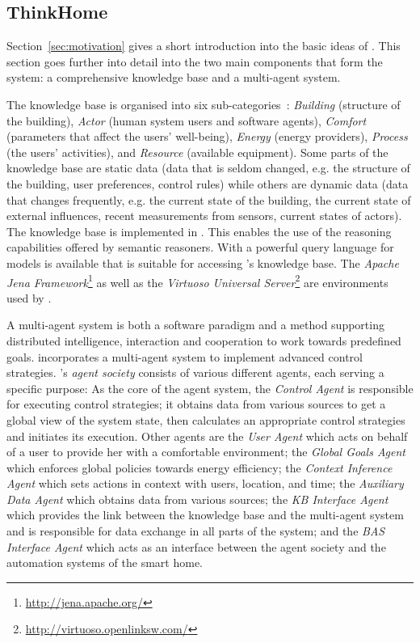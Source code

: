 \subsection{ThinkHome}

Section~\ref{sec:motivation} gives a short introduction into the basic ideas of \thinkhome. This section goes further into detail into the two main components that form the \thinkhome system: a comprehensive knowledge base and a multi-agent system.

The knowledge base is organised into six sub-categories~\cite{CR2011-TH_Journal,CR2010-DEST_ThinkHome}: \emph{Building} (structure of the building), \emph{Actor} (human system users and software agents), \emph{Comfort} (parameters that affect the users' well-being), \emph{Energy} (energy providers), \emph{Process} (the users' activities), and \emph{Resource} (available equipment). Some parts of the knowledge base are static data (data that is seldom changed, e.g. the structure of the building, user preferences, control rules) while others are dynamic data (data that changes frequently, e.g. the current state of the building, the current state of external influences, recent measurements from sensors, current states of actors). The knowledge base is implemented in . This enables the use of the reasoning capabilities offered by semantic reasoners. With  a powerful query language for  models is available that is suitable for accessing \thinkhome's knowledge base.
The \emph{Apache Jena Framework}\footnote{\href{http://jena.
apache.org/}{http://jena.apache.org/}} as well as the \emph{Virtuoso Universal Server}\footnote{\href{http://virtuoso.openlinksw.com/}{http://virtuoso.openlinksw.com/}} are environments used by \thinkhome.


A multi-agent system is both a software paradigm and a method supporting distributed intelligence, interaction and cooperation to work towards predefined goals. \thinkhome incorporates a multi-agent system to implement advanced control strategies. \thinkhome's \emph{agent society} consists of various different agents, each serving a specific purpose: As the core of the agent system, the \emph{Control Agent} is responsible for executing control strategies; it obtains data from various sources to get a global view of the system state, then calculates an appropriate control strategies and initiates its execution. Other agents are the \emph{User Agent} which acts on behalf of a user to provide her with a comfortable environment; the \emph{Global Goals Agent} which enforces global policies towards energy efficiency; the \emph{Context Inference Agent} which sets actions in context with users, location, and time; the \emph{Auxiliary Data Agent} which obtains data from various sources;
the \emph{KB Interface Agent} which provides the link between the knowledge base and the multi-agent system and is responsible for data exchange in all parts of the system; and the \emph{BAS Interface Agent} which acts as an interface between the agent society and the automation systems of the smart home.

